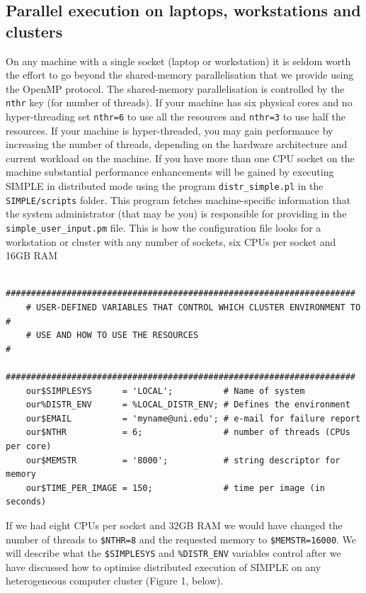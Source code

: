 \documentclass[a4paper,11pt]{article}
\newcommand{\prgname}[1]{\textcolor{NavyBlue}{\texttt{#1}}}
\begin{document}
\subsection{Parallel execution on laptops, workstations and clusters}
\label{paraexec}
On any machine with a single socket (laptop or workstation) it is seldom worth the effort to go beyond the shared-memory parallelisation that we provide using the OpenMP protocol. The shared-memory parallelisation is controlled by the \texttt{nthr} key (for number of threads). If your machine has six physical cores and no hyper-threading set \texttt{nthr=6} to use all the resources and \texttt{nthr=3} to use half the resources. If your machine is hyper-threaded, you may gain performance by increasing the number of threads, depending on the hardware architecture and current workload on the machine. If you have more than one CPU socket on the machine substantial performance enhancements will be gained by executing SIMPLE in distributed mode using the program \prgname{distr\_simple.pl} in the \texttt{SIMPLE/scripts} folder. This program fetches machine-specific information that the system administrator (that may be you) is responsible for providing in the \texttt{simple\_user\_input.pm} file. This is how the configuration file looks for a workstation or cluster with any number of sockets, six CPUs per socket and 16GB RAM
\begin{verbatim}
    #####################################################################
    # USER-DEFINED VARIABLES THAT CONTROL WHICH CLUSTER ENVIRONMENT TO  #
    # USE AND HOW TO USE THE RESOURCES                                  #
    #####################################################################
    our$SIMPLESYS      = 'LOCAL';          # Name of system
    our%DISTR_ENV      = %LOCAL_DISTR_ENV; # Defines the environment     
    our$EMAIL          = 'myname@uni.edu'; # e-mail for failure report
    our$NTHR           = 6;                # number of threads (CPUs per core)
    our$MEMSTR         = '8000';           # string descriptor for memory
    our$TIME_PER_IMAGE = 150;              # time per image (in seconds)
\end{verbatim}
If we had eight CPUs per socket and 32GB RAM we would have changed the number of threads to \texttt{\$NTHR=8} and the requested memory to \texttt{\$MEMSTR=16000}. We will describe what the \texttt{\$SIMPLESYS} and \texttt{\%DISTR\_ENV} variables control after we have discussed how to optimise distributed execution of SIMPLE on any heterogeneous computer cluster (Figure 1, below). 
\end{document}
